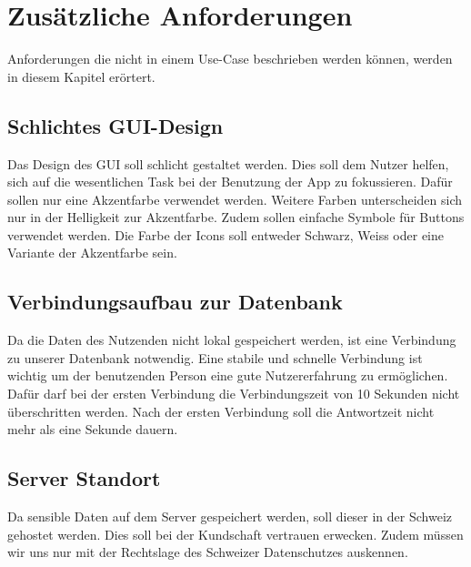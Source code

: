 \section{Zusätzliche Anforderungen}

Anforderungen die nicht in einem Use-Case beschrieben werden können, werden in diesem Kapitel erörtert.


\subsection{Schlichtes GUI-Design}
Das Design des \ac{GUI} soll schlicht gestaltet werden. Dies soll dem Nutzer helfen, sich auf die wesentlichen Task bei der Benutzung der App zu fokussieren. Dafür sollen nur eine Akzentfarbe verwendet werden. Weitere Farben unterscheiden sich nur in der Helligkeit zur Akzentfarbe. Zudem sollen einfache Symbole für Buttons verwendet werden. Die Farbe der Icons soll entweder Schwarz, Weiss oder eine Variante der Akzentfarbe sein. 


\subsection{Verbindungsaufbau zur Datenbank}
Da die Daten des Nutzenden nicht lokal gespeichert werden, ist eine Verbindung zu unserer Datenbank notwendig. Eine stabile und schnelle Verbindung ist wichtig um der benutzenden Person eine gute Nutzererfahrung zu ermöglichen. Dafür darf bei der ersten Verbindung die Verbindungszeit von 10 Sekunden nicht überschritten werden. Nach der ersten Verbindung soll die Antwortzeit nicht mehr als eine Sekunde dauern.


\subsection{Server Standort}
Da sensible Daten auf dem Server gespeichert werden, soll dieser in der Schweiz gehostet werden. Dies soll bei der Kundschaft vertrauen erwecken. Zudem müssen wir uns nur mit der Rechtslage des Schweizer Datenschutzes auskennen.
